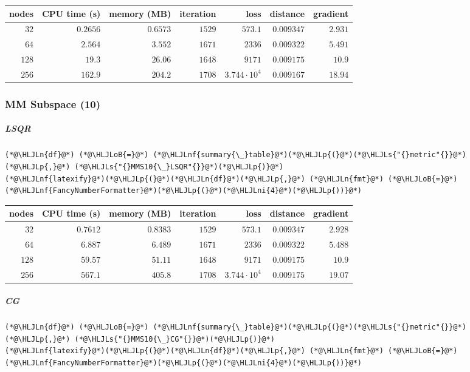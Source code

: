 \documentclass[12pt,a4paper]{article}
\newcommand{\HLJLn}[1]{#1}
\newcommand{\HLJLnf}[1]{\textcolor[RGB]{66,102,213}{#1}}
\newcommand{\HLJLs}[1]{\textcolor[RGB]{201,61,57}{#1}}
\newcommand{\HLJLni}[1]{\textcolor[RGB]{59,151,46}{#1}}
\newcommand{\HLJLoB}[1]{\textcolor[RGB]{102,102,102}{\textbf{#1}}}
\newcommand{\HLJLp}[1]{#1}
\begin{document}
\begin{tabular}
{r | r | r | r | r | r | r}
nodes & CPU time (s) & memory (MB) & iteration & loss & distance & gradient \\
\hline
$32$ & $0.2656$ & $0.6573$ & $1529$ & $573.1$ & $0.009347$ & $2.931$ \\
$64$ & $2.564$ & $3.552$ & $1671$ & $2336$ & $0.009322$ & $5.491$ \\
$128$ & $19.3$ & $26.06$ & $1648$ & $9171$ & $0.009175$ & $10.9$ \\
$256$ & $162.9$ & $204.2$ & $1708$ & $3.744 \cdot 10^{4}$ & $0.009167$ & $18.94$ \\
\end{tabular}


\subsubsection{MM Subspace (10)}
\subparagraph{LSQR}

\begin{lstlisting}
(*@\HLJLn{df}@*) (*@\HLJLoB{=}@*) (*@\HLJLnf{summary{\_}table}@*)(*@\HLJLp{(}@*)(*@\HLJLs{"{}metric"{}}@*)(*@\HLJLp{,}@*) (*@\HLJLs{"{}MMS10{\_}LSQR"{}}@*)(*@\HLJLp{)}@*)
(*@\HLJLnf{latexify}@*)(*@\HLJLp{(}@*)(*@\HLJLn{df}@*)(*@\HLJLp{,}@*) (*@\HLJLn{fmt}@*) (*@\HLJLoB{=}@*) (*@\HLJLnf{FancyNumberFormatter}@*)(*@\HLJLp{(}@*)(*@\HLJLni{4}@*)(*@\HLJLp{))}@*)
\end{lstlisting}


\begin{tabular}
{r | r | r | r | r | r | r}
nodes & CPU time (s) & memory (MB) & iteration & loss & distance & gradient \\
\hline
$32$ & $0.7612$ & $0.8383$ & $1529$ & $573.1$ & $0.009347$ & $2.928$ \\
$64$ & $6.887$ & $6.489$ & $1671$ & $2336$ & $0.009322$ & $5.488$ \\
$128$ & $59.57$ & $51.11$ & $1648$ & $9171$ & $0.009175$ & $10.9$ \\
$256$ & $567.1$ & $405.8$ & $1708$ & $3.744 \cdot 10^{4}$ & $0.009175$ & $19.07$ \\
\end{tabular}


\subparagraph{CG}

\begin{lstlisting}
(*@\HLJLn{df}@*) (*@\HLJLoB{=}@*) (*@\HLJLnf{summary{\_}table}@*)(*@\HLJLp{(}@*)(*@\HLJLs{"{}metric"{}}@*)(*@\HLJLp{,}@*) (*@\HLJLs{"{}MMS10{\_}CG"{}}@*)(*@\HLJLp{)}@*)
(*@\HLJLnf{latexify}@*)(*@\HLJLp{(}@*)(*@\HLJLn{df}@*)(*@\HLJLp{,}@*) (*@\HLJLn{fmt}@*) (*@\HLJLoB{=}@*) (*@\HLJLnf{FancyNumberFormatter}@*)(*@\HLJLp{(}@*)(*@\HLJLni{4}@*)(*@\HLJLp{))}@*)
\end{lstlisting}
\end{document}
